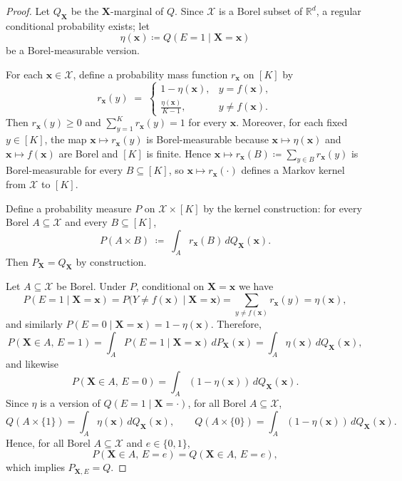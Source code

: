 \documentclass{article}
\theoremstyle{plain}
\theoremstyle{definition}
\theoremstyle{remark}
\begin{document}
\begin{proof}
Let $Q_{\mathbf{X}}$ be the $\mathbf{X}$-marginal of $Q$. Since $\mathcal X$ is a Borel subset of $\mathbb R^d$, a regular conditional probability exists; let
\[
\eta(\mathbf{x})\coloneqq Q(E=1\mid \mathbf{X}=\mathbf{x})
\]
be a Borel-measurable version.

For each $\mathbf{x}\in\mathcal X$, define a probability mass function $r_{\mathbf{x}}$ on $[K]$ by
\[
r_{\mathbf{x}}(y)\;=\;
\begin{cases}
1-\eta(\mathbf{x}), & y=f(\mathbf{x}),\\[3pt]
\displaystyle \frac{\eta(\mathbf{x})}{K-1}, & y\neq f(\mathbf{x}).
\end{cases}
\]
Then $r_{\mathbf{x}}(y)\ge 0$ and $\sum_{y=1}^K r_{\mathbf{x}}(y)=1$ for every $\mathbf{x}$.
Moreover, for each fixed $y\in[K]$, the map $\mathbf{x}\mapsto r_{\mathbf{x}}(y)$ is Borel-measurable because $\mathbf{x}\mapsto \eta(\mathbf{x})$ and $\mathbf{x}\mapsto f(\mathbf{x})$ are Borel and $[K]$ is finite. Hence $\mathbf{x}\mapsto r_{\mathbf{x}}(B)\coloneqq \sum_{y\in B} r_{\mathbf{x}}(y)$ is Borel-measurable for every $B\subseteq[K]$, so $\mathbf{x}\mapsto r_{\mathbf{x}}(\cdot)$ defines a Markov kernel from $\mathcal X$ to $[K]$.

Define a probability measure $P$ on $\mathcal X\times[K]$ by the kernel construction: for every Borel $A\subseteq\mathcal X$ and every $B\subseteq[K]$,
\[
P(A\times B)\;\coloneqq\;\int_A r_{\mathbf{x}}(B)\, dQ_{\mathbf{X}}(\mathbf{x}).
\]
Then $P_{\mathbf{X}}=Q_{\mathbf{X}}$ by construction.

Let $A\subseteq\mathcal X$ be Borel. Under $P$, conditional on $\mathbf{X}=\mathbf{x}$ we have
\[
P(E=1\mid \mathbf{X}=\mathbf{x})
= P\big(Y\neq f(\mathbf{x})\mid \mathbf{X}=\mathbf{x}\big)
= \sum_{y\neq f(\mathbf{x})} r_{\mathbf{x}}(y)
= \eta(\mathbf{x}),
\]
and similarly $P(E=0\mid \mathbf{X}=\mathbf{x})=1-\eta(\mathbf{x})$. Therefore,
\[
P(\mathbf{X}\in A,\,E=1)
= \int_A P(E=1\mid \mathbf{X}=\mathbf{x})\, dP_{\mathbf{X}}(\mathbf{x})
= \int_A \eta(\mathbf{x})\, dQ_{\mathbf{X}}(\mathbf{x}),
\]
and likewise
\[
P(\mathbf{X}\in A,\,E=0)
= \int_A (1-\eta(\mathbf{x}))\, dQ_{\mathbf{X}}(\mathbf{x}).
\]
Since $\eta$ is a version of $Q(E=1\mid \mathbf{X}=\cdot)$, for all Borel $A\subseteq\mathcal X$,
\[
Q(A\times\{1\})=\int_A \eta(\mathbf{x})\, dQ_{\mathbf{X}}(\mathbf{x}),
\qquad
Q(A\times\{0\})=\int_A (1-\eta(\mathbf{x}))\, dQ_{\mathbf{X}}(\mathbf{x}).
\]
Hence, for all Borel $A\subseteq\mathcal X$ and $e\in\{0,1\}$,
\[
P(\mathbf{X}\in A,\,E=e)=Q(\mathbf{X}\in A,\,E=e),
\]
which implies $P_{\mathbf{X},E}=Q$.
\end{proof}
\end{document}

